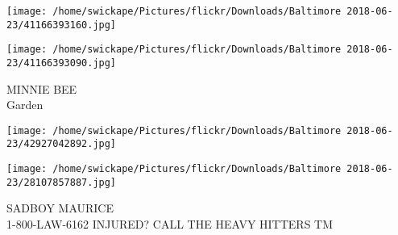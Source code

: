 \documentclass[10pt,letterpaper]{article}
\begin{document}
\texttt{[image: /home/swickape/Pictures/flickr/Downloads/Baltimore 2018-06-23/41166393160.jpg]}

\vspace{0.25in}
\texttt{[image: /home/swickape/Pictures/flickr/Downloads/Baltimore 2018-06-23/41166393090.jpg]}

MINNIE BEE\\
Garden
\pagebreak

\texttt{[image: /home/swickape/Pictures/flickr/Downloads/Baltimore 2018-06-23/42927042892.jpg]}

\vspace{0.25in}
\texttt{[image: /home/swickape/Pictures/flickr/Downloads/Baltimore 2018-06-23/28107857887.jpg]}

SADBOY MAURICE\\
1{-}800{-}LAW{-}6162 INJURED?  CALL THE HEAVY HITTERS TM
\pagebreak
\end{document}
